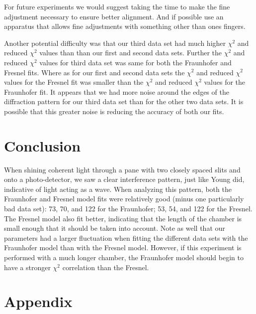 \documentclass[prb,preprint]{revtex4-1}
\begin{document}
For future experiments we would suggest taking the time to make the fine adjustment necessary to ensure better alignment. And if possible use an apparatus that allows fine adjustments with something other than ones fingers.

Another potential difficulty was that our third data set had much higher $\chi^2$ and reduced $\chi^2$ values than than our first and second data sets. Further the $\chi^2$ and reduced $\chi^2$ values for third data set was same for both the Fraunhofer and Fresnel fits. Where as for our first and second data sets the $\chi^2$ and reduced $\chi^2$ values for the Fresnel fit was smaller than the $\chi^2$ and reduced $\chi^2$ values for the Fraunhofer fit. It appears that we had more noise around the edges of the diffraction pattern for our third data set than for the other two data sets. It is possible that this greater noise is reducing the accuracy of both our fits.

\section{Conclusion}

When shining coherent light through a pane with two closely spaced slits and onto a photo-detector, we saw a clear interference pattern, just like Young did, indicative of light acting as a wave. When analyzing this pattern, both the Fraunhofer and Fresnel model fits were relatively good (minus one particularly bad data set): 73, 70, and 122 for the Fraunhofer; 53, 54, and 122 for the Fresnel. The Fresnel model also fit better, indicating that the length of the chamber is small enough that it should be taken into account. Note as well that our parameters had a larger fluctuation when fitting the different data sets with the Fraunhofer model than with the Fresnel model. However, if this experiment is performed with a much longer chamber, the Fraunhofer model should begin to have a stronger $\chi^2$ correlation than the Fresnel.

\section{Appendix}
\end{document}
